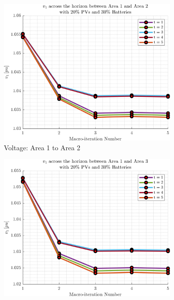 \documentclass[../../outputs/main.tex]{subfiles}
\begin{document}
\begin{figure}[h!]
    \begin{subfigure}[b]{0.3\textwidth}
        \centering
        \includegraphics[width=\textwidth]{../figures/T5-pv20-batt30-genCost/dopf/convergenceCurves/BoundaryVoltage_vs_t_vs_macroItr_T_5_Areas_1_2_genCost_pv_20_batt_30_.png}
        \caption{\scriptsize Voltage: Area 1 to Area 2}
        \label{fig:voltage_1_2}
    \end{subfigure}
    \hfill
    \begin{subfigure}[b]{0.3\textwidth}
        \centering
        \includegraphics[width=\textwidth]{../figures/T5-pv20-batt30-genCost/dopf/convergenceCurves/BoundaryVoltage_vs_t_vs_macroItr_T_5_Areas_1_3_genCost_pv_20_batt_30_.png}

\end{subfigure}
\end{figure}
\end{document}
